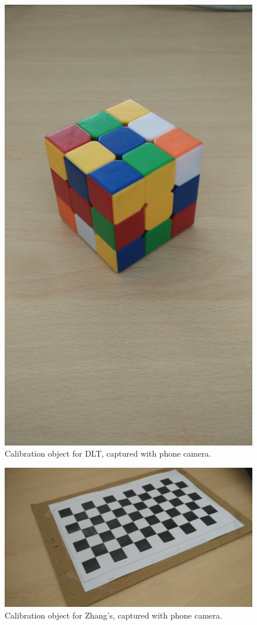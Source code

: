\documentclass[a4paper,11pt]{article}
\begin{document}
  \begin{figure}[H]
   \centering
   \includegraphics[scale=0.05]{cube.jpg}
   \caption{Calibration object for DLT, captured with phone camera.}
  \end{figure}
  
  \begin{figure}[H]
   \centering
   \includegraphics[scale=0.08]{checkerboard-phone}
   \caption{Calibration object for Zhang's, captured with phone camera.}
  \end{figure}
\end{document}
